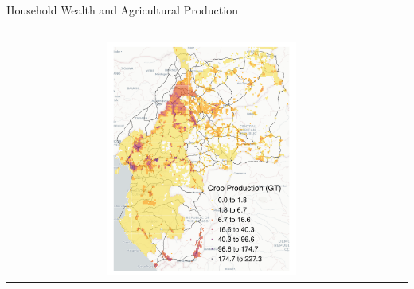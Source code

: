 \documentclass[aspectratio=169,xcolor=dvipsnames]{beamer}
\begin{document}
\begin{frame}{Household Wealth and Agricultural Production}
\begin{adjustbox}{center}
\begin{columns}
\begin{column}{0.85\textwidth}
{\begin{tabular}{@{}c@{}c@{}}
\includegraphics[width=0.5\textwidth, trim= {5mm 0 5mm 0}, clip]{"../figures/crops/SPAM_CEMAC_TOP80.pdf"}
\end{tabular}
}
        \end{column}
    \end{columns}
  \end{adjustbox}
\end{frame}
\end{document}

